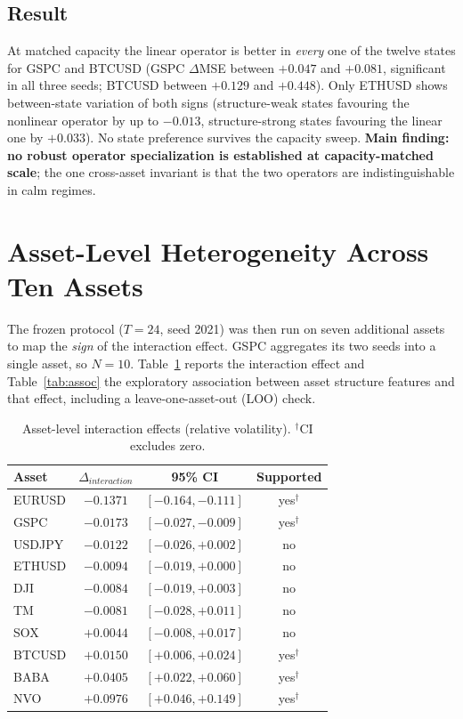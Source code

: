 \documentclass[conference]{IEEEtran}
\begin{document}
\subsection{Result}
At matched capacity the linear operator is better in \emph{every} one of the twelve states for
GSPC and BTCUSD (GSPC $\Delta$MSE between $+0.047$ and $+0.081$, significant in all three seeds;
BTCUSD between $+0.129$ and $+0.448$). Only ETHUSD shows between-state variation of both signs
(structure-weak states favouring the nonlinear operator by up to $-0.013$, structure-strong states
favouring the linear one by $+0.033$). No state preference survives the capacity sweep.
\textbf{Main finding: no robust operator specialization is established at capacity-matched
scale}; the one cross-asset invariant is that the two operators are indistinguishable in calm
regimes.

\section{Asset-Level Heterogeneity Across Ten Assets}
The frozen protocol ($T=24$, seed 2021) was then run on seven additional assets to map the
\emph{sign} of the interaction effect. GSPC aggregates its two seeds into a single asset, so
$N=10$. Table~\ref{tab:assets} reports the interaction effect and Table~\ref{tab:assoc} the
exploratory association between asset structure features and that effect, including a
leave-one-asset-out (LOO) check.

\begin{table}[!t]
\caption{Asset-level interaction effects (relative volatility).
$^\dagger$CI excludes zero.}
\label{tab:assets}
\centering
\small
\begin{tabular}{@{}lccc@{}}
\toprule
Asset & $\Delta_{interaction}$ & 95\% CI & Supported \\
\midrule
EURUSD & $-0.1371$ & $[-0.164,-0.111]$ & yes$^\dagger$ \\
GSPC   & $-0.0173$ & $[-0.027,-0.009]$ & yes$^\dagger$ \\
USDJPY & $-0.0122$ & $[-0.026,+0.002]$ & no \\
ETHUSD & $-0.0094$ & $[-0.019,+0.000]$ & no \\
DJI    & $-0.0084$ & $[-0.019,+0.003]$ & no \\
TM     & $-0.0081$ & $[-0.028,+0.011]$ & no \\
SOX    & $+0.0044$ & $[-0.008,+0.017]$ & no \\
BTCUSD & $+0.0150$ & $[+0.006,+0.024]$ & yes$^\dagger$ \\
BABA   & $+0.0405$ & $[+0.022,+0.060]$ & yes$^\dagger$ \\
NVO    & $+0.0976$ & $[+0.046,+0.149]$ & yes$^\dagger$ \\
\bottomrule
\end{tabular}
\end{table}
\end{document}
